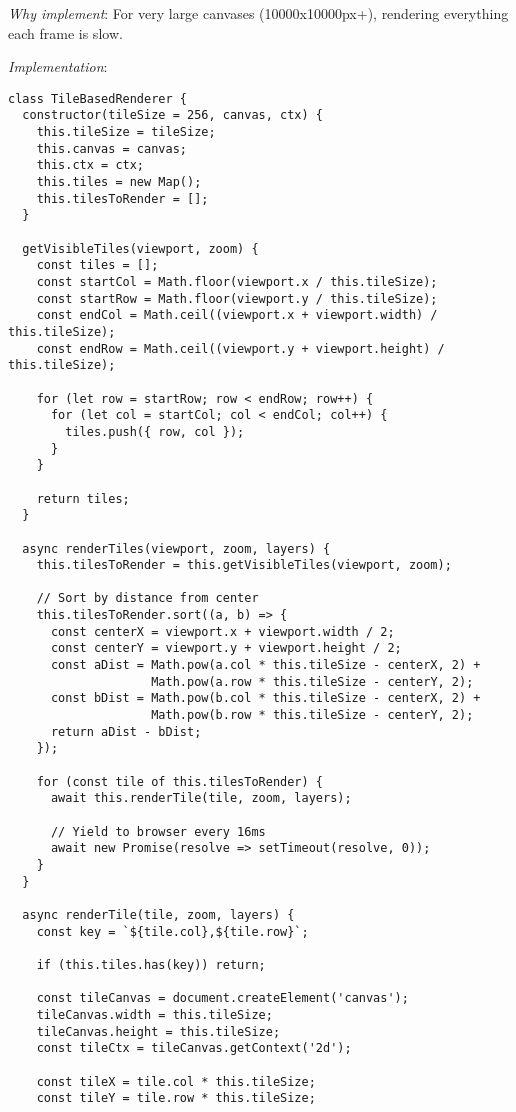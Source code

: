 \documentclass[11pt]{article}
\begin{document}
\begin{enumerate}
\begin{enumerate}
\emph{Why implement}: For very large canvases (10000x10000px+), rendering everything each frame is slow.

\emph{Implementation}:
\begin{verbatim}
class TileBasedRenderer {
  constructor(tileSize = 256, canvas, ctx) {
    this.tileSize = tileSize;
    this.canvas = canvas;
    this.ctx = ctx;
    this.tiles = new Map();
    this.tilesToRender = [];
  }
  
  getVisibleTiles(viewport, zoom) {
    const tiles = [];
    const startCol = Math.floor(viewport.x / this.tileSize);
    const startRow = Math.floor(viewport.y / this.tileSize);
    const endCol = Math.ceil((viewport.x + viewport.width) / this.tileSize);
    const endRow = Math.ceil((viewport.y + viewport.height) / this.tileSize);
    
    for (let row = startRow; row < endRow; row++) {
      for (let col = startCol; col < endCol; col++) {
        tiles.push({ row, col });
      }
    }
    
    return tiles;
  }
  
  async renderTiles(viewport, zoom, layers) {
    this.tilesToRender = this.getVisibleTiles(viewport, zoom);
    
    // Sort by distance from center
    this.tilesToRender.sort((a, b) => {
      const centerX = viewport.x + viewport.width / 2;
      const centerY = viewport.y + viewport.height / 2;
      const aDist = Math.pow(a.col * this.tileSize - centerX, 2) + 
                    Math.pow(a.row * this.tileSize - centerY, 2);
      const bDist = Math.pow(b.col * this.tileSize - centerX, 2) + 
                    Math.pow(b.row * this.tileSize - centerY, 2);
      return aDist - bDist;
    });
    
    for (const tile of this.tilesToRender) {
      await this.renderTile(tile, zoom, layers);
      
      // Yield to browser every 16ms
      await new Promise(resolve => setTimeout(resolve, 0));
    }
  }
  
  async renderTile(tile, zoom, layers) {
    const key = `${tile.col},${tile.row}`;
    
    if (this.tiles.has(key)) return;
    
    const tileCanvas = document.createElement('canvas');
    tileCanvas.width = this.tileSize;
    tileCanvas.height = this.tileSize;
    const tileCtx = tileCanvas.getContext('2d');
    
    const tileX = tile.col * this.tileSize;
    const tileY = tile.row * this.tileSize;
    

\end{verbatim}
\end{enumerate}
\end{enumerate}
\end{document}
